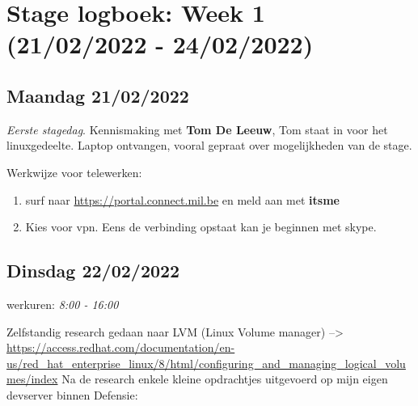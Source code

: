 
\hypertarget{stage-logboek-week-1-21022022---24022022}{%
\section{Stage logboek: Week 1 (21/02/2022 -
24/02/2022)}\label{stage-logboek-week-1-21022022---24022022}}

\hypertarget{maandag-21022022}{%
\subsection{Maandag 21/02/2022}\label{maandag-21022022}}

\emph{Eerste stagedag}. Kennismaking met \textbf{Tom De Leeuw}, Tom
staat in voor het linuxgedeelte. Laptop ontvangen, vooral gepraat over
mogelijkheden van de stage.

Werkwijze voor telewerken:

\begin{enumerate}
\def\labelenumi{\arabic{enumi}.}
\tightlist
\item
  surf naar \url{https://portal.connect.mil.be} en meld aan met
  \textbf{itsme}
\item
  Kies voor vpn. Eens de verbinding opstaat kan je beginnen met skype.
\end{enumerate}

\hypertarget{dinsdag-22022022}{%
\subsection{Dinsdag 22/02/2022}\label{dinsdag-22022022}}

werkuren: \emph{8:00 - 16:00}

Zelfstandig research gedaan naar LVM (Linux Volume manager)
--\textgreater{}
\url{https://access.redhat.com/documentation/en-us/red_hat_enterprise_linux/8/html/configuring_and_managing_logical_volumes/index}
Na de research enkele kleine opdrachtjes uitgevoerd op mijn eigen
devserver binnen Defensie:

